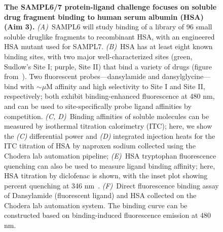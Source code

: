 \documentclass[11pt]{article}
\begin{document}
\begin{figure}[h]
\begin{centering}

\end{centering}
\vspace{-0.1in}
\caption{\footnotesize {\bf The SAMPL6/7 protein-ligand challenge focuses on soluble drug fragment binding to human serum albumin (HSA) (Aim 3).}
\emph{(A)}~SAMPL6 will study binding of a library of 96 small soluble druglike fragments to recombinant HSA, with an engineered HSA mutant used for SAMPL7.
\emph{(B)}~HSA has at least eight known binding sites, with two major well-characterized sites (green, Sudlow's Site I; purple, Site II) that bind a variety of drugs (figure from~\cite{Hall:2013:JournalofChemicalInformationandModeling}).
Two fluorescent probes---dansylamide and dansylglycine---bind with $\sim$$\mu$M affinity and high selectivity to Site I and Site II, respectively; both exhibit binding-enhanced fluorescence at 480 nm, and can be used to site-specifically probe ligand affinities by competition.
\emph{(C, D)}~Binding affinities of soluble molecules can be measured by isothermal titration calorimetry (ITC); here, we show the \emph{(C)} differential power and \emph{(D)} integrated injection heats for the ITC titration of HSA by naproxen sodium collected using the Chodera lab automation pipeline;
\emph{(E)}~HSA tryptophan fluorescence quenching can also be used to measure ligand binding affinity; here, HSA titration by diclofenac is shown, with the inset plot showing percent quenching at 346 nm~\cite{Epps:1999:JournalofPharmacyandPharmacology,Bou-Abdallah:2016:TheJournalofChemicalThermodynamics}.
\emph{(F)}~Direct fluorescence binding assay of Dansylamide (fluorescent ligand) and HSA collected on the Chodera lab automation system. 
The binding curve can be constructed based on binding-induced fluorescence emission at 480 nm.
\vspace{-0.25in}
\label{figure:hsa-challenge}}
\end{figure}

\eject
\end{document}
